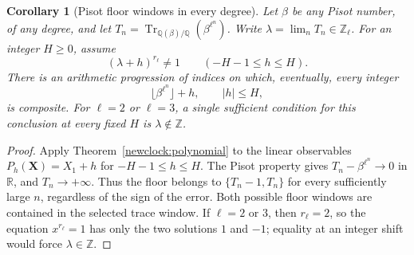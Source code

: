 \documentclass[11pt,a4paper]{article}
\newtheorem{corollary}[theorem]{Corollary}
\theoremstyle{definition}\newtheorem{definition}[theorem]{Definition}
\theoremstyle{remark}\newtheorem{remark}[theorem]{Remark}
\begin{document}
\begin{corollary}[Pisot floor windows in every degree]
\label{newclock:floors}
Let $\beta$ be any Pisot number, of any degree, and let
$T_n=\operatorname{Tr}_{\mathbb Q(\beta)/\mathbb Q}
(\beta^{\ell^n})$.  Write $\lambda=\lim_n T_n\in\mathbb Z_\ell$.
For an integer $H\ge0$, assume
\[
 (\lambda+h)^{r_\ell}\ne1
       \qquad(-H-1\le h\le H).
\]
There is an arithmetic progression of indices on which,
eventually, every integer
\[
 \lfloor\beta^{\ell^n}\rfloor+h,\qquad |h|\le H,
\]
is composite.  For $\ell=2$ or $\ell=3$, a single sufficient
condition for this conclusion at every fixed $H$ is
$\lambda\notin\mathbb Z$.
\end{corollary}
\begin{proof}
Apply Theorem~\ref{newclock:polynomial} to the linear observables
$P_h(\boldsymbol X)=X_1+h$ for $-H-1\le h\le H$.
The Pisot property gives $T_n-\beta^{\ell^n}\to0$ in
$\mathbb R$, and $T_n\to+\infty$.  Thus the floor belongs
to $\{T_n-1,T_n\}$ for every sufficiently large $n$,
regardless of the sign of the error.  Both possible floor
windows are contained in the selected trace window.  If
$\ell=2$ or $3$, then $r_\ell=2$, so the equation $x^{r_\ell}=1$
has only the two solutions $1$ and $-1$; equality at an
integer shift would force $\lambda\in\mathbb Z$.
\end{proof}
\end{document}
